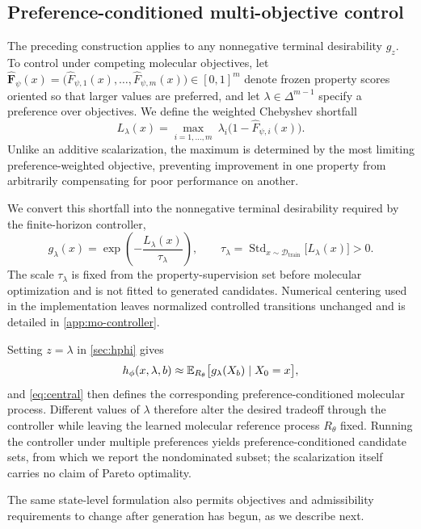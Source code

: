 \subsection{Preference-conditioned multi-objective control}
\label{sec:preferences}

The preceding construction applies to any nonnegative terminal desirability $g_z$. To control \method{} under competing molecular objectives, let $\widehat{\mathbf F}_\psi(x)=\bigl(\widehat F_{\psi,1}(x),\ldots,\widehat F_{\psi,m}(x)\bigr)\in[0,1]^m$ denote frozen property scores oriented so that larger values are preferred, and let $\lambda\in\Delta^{m-1}$ specify a preference over objectives. We define the weighted Chebyshev shortfall
\begin{equation}
L_\lambda(x)=\max_{i=1,\ldots,m}\ \lambda_i\bigl(1-\widehat F_{\psi,i}(x)\bigr).
\label{eq:cheby}
\end{equation}
Unlike an additive scalarization, the maximum is determined by the most limiting preference-weighted objective, preventing improvement in one property from arbitrarily compensating for poor performance on another.

We convert this shortfall into the nonnegative terminal desirability required by the finite-horizon controller,
\begin{equation}
g_\lambda(x)=\exp\!\left(-\frac{L_\lambda(x)}{\tau_\lambda}\right),
\qquad
\tau_\lambda=\operatorname{Std}_{x\sim\mathcal D_{\mathrm{train}}}\bigl[L_\lambda(x)\bigr]>0.
\label{eq:glambda}
\end{equation}
The scale $\tau_\lambda$ is fixed from the property-supervision set before molecular optimization and is not fitted to generated candidates. Numerical centering used in the implementation leaves normalized controlled transitions unchanged and is detailed in \cref{app:mo-controller}.

Setting $z=\lambda$ in \cref{sec:hphi} gives
\[
h_\phi(x,\lambda,b)\approx\mathbb{E}_{R_\theta}\bigl[g_\lambda(X_b)\mid X_0=x\bigr],
\]
and \cref{eq:central} then defines the corresponding preference-conditioned molecular process. Different values of $\lambda$ therefore alter the desired tradeoff through the controller while leaving the learned molecular reference process $R_\theta$ fixed. Running the controller under multiple preferences yields preference-conditioned candidate sets, from which we report the nondominated subset; the scalarization itself carries no claim of Pareto optimality.

The same state-level formulation also permits objectives and admissibility requirements to change after generation has begun, as we describe next.

